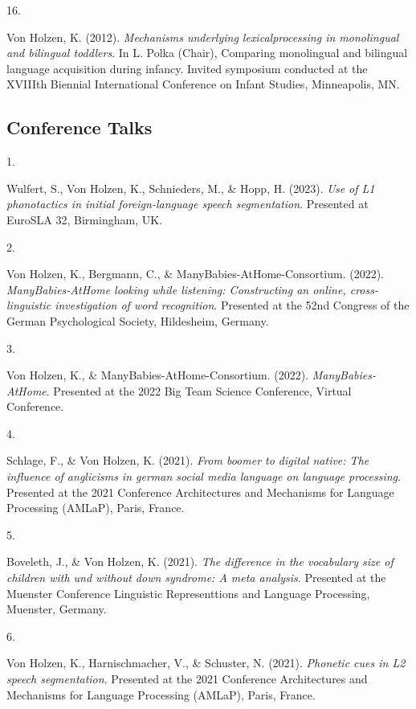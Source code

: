 \documentclass[10pt,a4paper,]{article}
\newlength{\cslhangindent}
\newlength{\csllabelwidth}
\newcommand{\CSLLeftMargin}[1]{\parbox[t]{\csllabelwidth}{\hfill #1~}}
\newcommand{\CSLRightInline}[1]{\parbox[t]{\linewidth - \cslhangindent - \csllabelwidth}{#1}\vspace{0.8ex}}
\begin{document}
\leavevmode{}%
\CSLLeftMargin{16. }%
\CSLRightInline{Von Holzen, K. (2012). \emph{Mechanisms underlying
lexicalprocessing in monolingual and bilingual toddlers}. In L. Polka
(Chair), Comparing monolingual and bilingual language acquisition during
infancy. Invited symposium conducted at the XVIIIth Biennial
International Conference on Infant Studies, Minneapolis, MN.}

\hypertarget{conference-talks}{%
\subsection{Conference Talks}\label{conference-talks}}

\hypertarget{bibliography}{}
\leavevmode{}%
\CSLLeftMargin{1. }%
\CSLRightInline{Wulfert, S., Von Holzen, K., Schnieders, M., \& Hopp, H.
(2023). \emph{Use of L1 phonotactics in initial foreign-language speech
segmentation}. Presented at EuroSLA 32, Birmingham, UK.}

\leavevmode{}%
\CSLLeftMargin{2. }%
\CSLRightInline{Von Holzen, K., Bergmann, C., \&
ManyBabies-AtHome-Consortium. (2022). \emph{ManyBabies-AtHome looking
while listening: Constructing an online, cross-linguistic investigation
of word recognition}. Presented at the 52nd Congress of the German
Psychological Society, Hildesheim, Germany.}

\leavevmode{}%
\CSLLeftMargin{3. }%
\CSLRightInline{Von Holzen, K., \& ManyBabies-AtHome-Consortium. (2022).
\emph{ManyBabies-AtHome}. Presented at the 2022 Big Team Science
Conference, Virtual Conference.}

\leavevmode{}%
\CSLLeftMargin{4. }%
\CSLRightInline{Schlage, F., \& Von Holzen, K. (2021). \emph{From boomer
to digital native: The influence of anglicisms in german social media
language on language processing}. Presented at the 2021 Conference
Architectures and Mechanisms for Language Processing (AMLaP), Paris,
France.}

\leavevmode{}%
\CSLLeftMargin{5. }%
\CSLRightInline{Boveleth, J., \& Von Holzen, K. (2021). \emph{The
difference in the vocabulary size of children with und without down
syndrome: A meta analysis}. Presented at the Muenster Conference
Linguistic Representtions and Language Processing, Muenster, Germany.}

\leavevmode{}%
\CSLLeftMargin{6. }%
\CSLRightInline{Von Holzen, K., Harnischmacher, V., \& Schuster, N.
(2021). \emph{Phonetic cues in L2 speech segmentation}. Presented at the
2021 Conference Architectures and Mechanisms for Language Processing
(AMLaP), Paris, France.}
\end{document}
